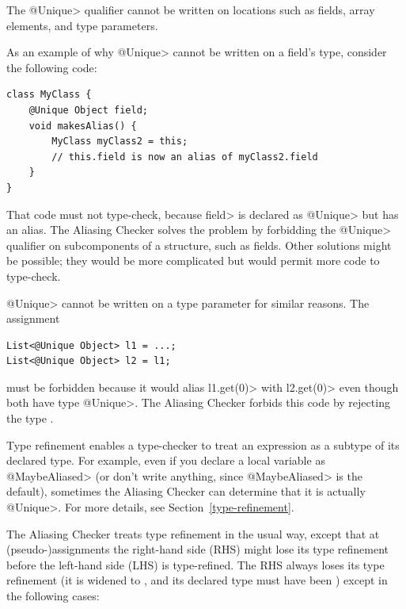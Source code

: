 The \<@Unique> qualifier cannot be written on locations such as fields,
array elements, and type parameters.

As an example of why \<@Unique> cannot be written on a field's type,
consider the following code:

\begin{Verbatim}
class MyClass {
    @Unique Object field;
    void makesAlias() {
        MyClass myClass2 = this;
        // this.field is now an alias of myClass2.field
    }
}
\end{Verbatim}

That code must not type-check, because \<field> is declared as \<@Unique>
but has an alias.  The Aliasing Checker solves the problem by forbidding
the \<@Unique> qualifier on subcomponents of a structure, such as fields.
Other solutions might be possible; they would be more complicated but would
permit more code to type-check.

\<@Unique> cannot be written on a type parameter for similar reasons.
The assignment

\begin{Verbatim}
List<@Unique Object> l1 = ...;
List<@Unique Object> l2 = l1;
\end{Verbatim}

\noindent
must be forbidden because it would alias \<l1.get(0)> with \<l2.get(0)>
even though both have type \<@Unique>.  The Aliasing Checker forbids this
code by rejecting the type .



Type refinement enables a type-checker to treat an expression as a subtype
of its declared type.  For example, even if you declare a local variable as
\<@MaybeAliased> (or don't write anything, since \<@MaybeAliased> is the
default), sometimes the Aliasing Checker can determine that it is actually
\<@Unique>.
For more details, see Section~\ref{type-refinement}.

The Aliasing Checker treats type refinement in the usual way,
except that at (pseudo-)assignments
the right-hand side (RHS) might lose its type refinement before the
left-hand side (LHS) is type-refined.
The RHS always loses its type refinement (it is widened to
, and its declared type must have been
) except in the following cases:

